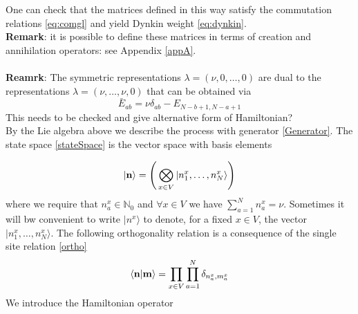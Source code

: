 \documentclass[11pt]{article}
\numberwithin{equation}{section}
\numberwithin{equation}{subsection}
\newcommand{\twoj}{\nu}
\begin{document}
One can check that the matrices defined in this way satisfy the commutation relations \eqref{eq:comgl} and yield Dynkin weight \eqref{eq:dynkin}. \\
\newline 
\textbf{Remark}: it is possible to define these matrices in terms of creation and annihilation operators: see Appendix \ref{appA}.
\\ \\
\textbf{Reamrk}: The symmetric representations $\lambda=(\twoj,0,\ldots,0)$ are dual to the representations $\lambda=(\twoj,\ldots,\twoj,0)$ that can be obtained via 
\begin{equation}
   \bar E_{ab}=\nu\delta_{ab}-E_{N-b+1,N-a+1}
\end{equation}
{\color{red} This needs to be checked and give alternative form of Hamiltonian?}\\
By the Lie algebra above we describe the process with generator \eqref{Generator}. The state space \eqref{stateSpace} is the vector space with basis elements 

\begin{equation}
|{\bf n}\rangle=\left(\,\bigotimes_{x\in V}	|n_{1}^{x},\ldots,n_{N}^{x}\rangle\right)
\end{equation}
where we require that $n_{a}^{x}\in \mathbb{N}_{0}$ and $\forall x\in V$ we have $\sum_{a=1}^{N}n_{a}^{x}=\nu$. Sometimes it will bw convenient to write $|n^{x}\rangle$ to denote, for a fixed $x\in V$, the vector $|n_{1}^{x},\ldots,n_{N}^{x}\rangle$. The following orthogonality relation is a consequence of the single site relation \eqref{ortho}
\begin{equation}
    \langle {\bf n}|{\bf m}\rangle =\prod_{x\in V}\prod_{a=1}^N\delta_{n^x_a,m^{x}_a}
\end{equation}
We introduce the Hamiltonian operator
\end{document}

